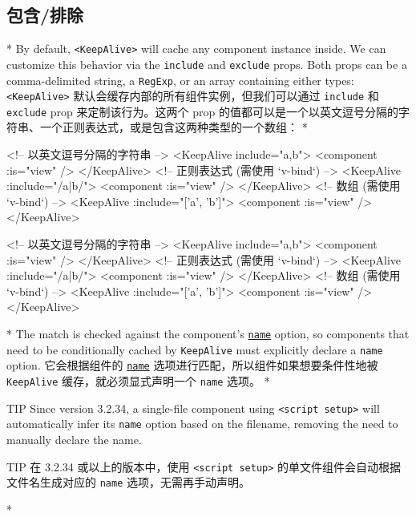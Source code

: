 \begin{paracol}{2}
\subsection{包含/排除}
\switchcolumn[0]*%
By default, \texttt{\textless{}KeepAlive\textgreater{}} will cache any
component instance inside. We can customize this behavior via the
\texttt{include} and \texttt{exclude} props. Both props can be a
comma-delimited string, a \texttt{RegExp}, or an array containing either
types:
\switchcolumn
\texttt{\textless{}KeepAlive\textgreater{}}
默认会缓存内部的所有组件实例，但我们可以通过 \texttt{include} 和
\texttt{exclude} prop 来定制该行为。这两个 prop
的值都可以是一个以英文逗号分隔的字符串、一个正则表达式，或是包含这两种类型的一个数组：
\switchcolumn[0]*%
\begin{codeHtml}
<!-- 以英文逗号分隔的字符串 -->
<KeepAlive include="a,b">
    <component :is="view" />
</KeepAlive>
<!-- 正则表达式 (需使用 `v-bind`) -->
<KeepAlive :include="/a|b/">
    <component :is="view" />
</KeepAlive>
<!-- 数组 (需使用 `v-bind`) -->
<KeepAlive :include="['a', 'b']">
    <component :is="view" />
</KeepAlive>
\end{codeHtml}
\switchcolumn
\begin{codeHtml}
<!-- 以英文逗号分隔的字符串 -->
<KeepAlive include="a,b">
  <component :is="view" />
</KeepAlive>
<!-- 正则表达式 (需使用 `v-bind`) -->
<KeepAlive :include="/a|b/">
  <component :is="view" />
</KeepAlive>
<!-- 数组 (需使用 `v-bind`) -->
<KeepAlive :include="['a', 'b']">
  <component :is="view" />
</KeepAlive>
\end{codeHtml}
\switchcolumn[0]*%
The match is checked against the component's
\href{https://vuejs.org/api/options-misc.html\#name}{\texttt{name}}
option, so components that need to be conditionally cached by
\texttt{KeepAlive} must explicitly declare a \texttt{name} option.
\switchcolumn
它会根据组件的
\href{https://cn.vuejs.org/api/options-misc.html\#name}{\texttt{name}}
选项进行匹配，所以组件如果想要条件性地被 \texttt{KeepAlive}
缓存，就必须显式声明一个 \texttt{name} 选项。
\switchcolumn[0]*%
\begin{vueQuote}{TIP}
Since version 3.2.34, a single-file component using
\texttt{\textless{}script\ setup\textgreater{}} will automatically infer
its \texttt{name} option based on the filename, removing the need to
manually declare the name.
\end{vueQuote} 
\switchcolumn
\begin{vueQuote}{TIP}
在 3.2.34 或以上的版本中，使用
\texttt{\textless{}script\ setup\textgreater{}}
的单文件组件会自动根据文件名生成对应的 \texttt{name}
选项，无需再手动声明。
\end{vueQuote} 
\switchcolumn[0]*%

\end{paracol}
